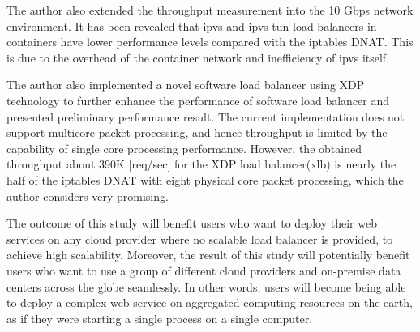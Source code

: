 The author also extended the throughput measurement into the 10 Gbps network environment.
It has been revealed that ipvs and ipvs-tun load balancers in containers have lower performance levels compared with the iptables DNAT.
This is due to the overhead of the container network and inefficiency of ipvs itself.

The author also implemented a novel software load balancer using XDP technology to further enhance the performance of software load balancer and presented preliminary performance result.
The current implementation does not support multicore packet processing, and hence throughput is limited by the capability of single core processing performance.
However, the obtained throughput about 390K [req/sec] for the XDP load balancer(xlb) is nearly the half of the iptables DNAT with eight physical core packet processing, which the author considers very promising.
 
The outcome of this study will benefit users who want to deploy their web services on any cloud provider where no scalable load balancer is provided, to achieve high scalability.
Moreover, the result of this study will potentially benefit users who want to use a group of different cloud providers and on-premise data centers across the globe seamlessly.
In other words, users will become being able to deploy a complex web service on aggregated computing resources on the earth, as if they were starting a single process on a single computer.


